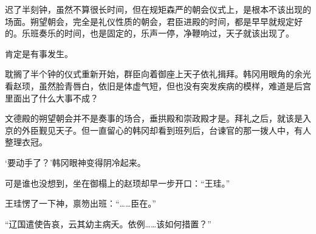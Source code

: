 迟了半刻钟，虽然不算很长时间，但在规矩森严的朝会仪式上，是根本不该出现的场面。朔望朝会，完全是礼仪性质的朝会，君臣进殿的时间，都是早早就规定好的。乐班奏乐的时间，也是固定的，乐声一停，净鞭响过，天子就该出现了。

肯定是有事发生。

耽搁了半个钟的仪式重新开始，群臣向着御座上天子依礼揖拜。韩冈用眼角的余光看赵顼，虽然脸青唇白，依旧是体虚气短，但也没有突发疾病的模样，难道是后宫里面出了什么大事不成？

文德殿的朔望朝会并不是奏事的场合，垂拱殿和崇政殿才是。拜礼之后，就该是入京的外臣觐见天子。但一直留心的韩冈却看到班列后，台谏官的那一拨人中，有人整理衣冠。

‘要动手了？’韩冈眼神变得阴冷起来。

可是谁也没想到，坐在御榻上的赵顼却早一步开口：“王珪。”

王珪愣了一下神，禀笏出班：“……臣在。”

“辽国遣使告哀，云其幼主病夭。依例……该如何措置？”

